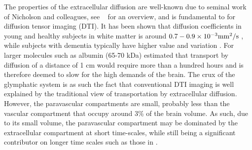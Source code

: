 \documentclass[12pt,a4paper]{article}
\begin{document}
The properties of the extracellular diffusion are well-known due to seminal work of Nicholson and colleagues, see  
~\cite{sykova2008diffusion} for an overview, and is fundamental to for  diffusion tensor imaging (DTI). 
It has been shown that diffusion coefficients in young and healthy subjects in white matter is around $0.7-0.9\times 10^{-3} \mathrm{mm\sp{2}/s}$ \citet{Helenius194},
while subjects with dementia typically have higher value and variation \cite{goujon2018can}. 
For larger molecules such as albumin (65-70 kDa) \citet{cserr1971physiology} estimated that transport by diffusion of a distance of 1 cm would require more than a hundred hours
and is therefore deemed to slow for the high demands of the brain.  
The crux of the glymphatic system is as such the fact that conventional DTI imaging is well explained by the traditional view of transportation by extracellular diffusion. 
However, the paravascular compartments are small, probably less than the vascular compartment that occupy around 3\% of the brain volume. As such, 
due to its small volume, the paravascular compartment may be dominated by the extracellular compartment at short time-scales, while still being a
significant contributor on longer time scales such as those in \cite{ringstad2018brain}. 

%
\end{document}
